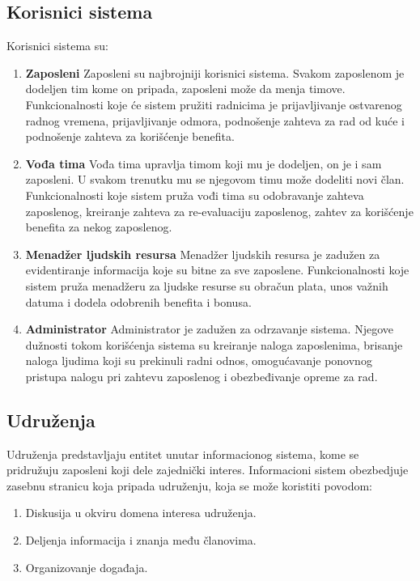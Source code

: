 \documentclass[a4paper]{article}
\begin{document}
\subsection{Korisnici sistema}
Korisnici sistema su:
\begin{enumerate}
    \item \textbf{Zaposleni} \newline
    Zaposleni su najbrojniji korisnici sistema. Svakom zaposlenom je dodeljen tim kome on pripada, zaposleni može da menja timove. Funkcionalnosti koje će sistem pružiti radnicima je prijavljivanje ostvarenog radnog vremena, prijavljivanje odmora, podnošenje zahteva za rad od kuće i podnošenje zahteva za korišćenje benefita.
    \item \textbf{Vođa tima} \newline
    Vođa tima upravlja timom koji mu je dodeljen, on je i sam zaposleni. U svakom trenutku mu se njegovom timu može dodeliti novi član. Funkcionalnosti koje sistem pruža vođi tima su odobravanje zahteva zaposlenog, kreiranje zahteva za re-evaluaciju zaposlenog, zahtev za korišćenje benefita za nekog zaposlenog.
    \item \textbf{Menadžer ljudskih resursa} \newline 
    Menadžer ljudskih resursa je zadužen za evidentiranje informacija koje su bitne za sve zaposlene. Funkcionalnosti koje sistem pruža menadžeru za ljudske resurse su obračun plata, unos važnih datuma i dodela odobrenih benefita i bonusa.
    \item \textbf{Administrator} \newline
    Administrator je zadužen za odrzavanje sistema. Njegove dužnosti tokom korišćenja sistema su kreiranje naloga zaposlenima, brisanje naloga ljudima koji su prekinuli radni odnos, omogućavanje ponovnog pristupa nalogu pri zahtevu zaposlenog i obezbeđivanje opreme za rad. 
\end{enumerate}

\subsection{Udruženja}
Udruženja predstavljaju entitet unutar informacionog sistema, kome se pridružuju zaposleni koji dele zajednički interes. \newline
Informacioni sistem obezbedjuje zasebnu stranicu koja pripada udruženju, koja se može koristiti povodom:
\begin{enumerate}
    \item Diskusija u okviru domena interesa udruženja.
    \item Deljenja informacija i znanja među članovima.
    \item Organizovanje događaja.
\end{enumerate}
\end{document}

